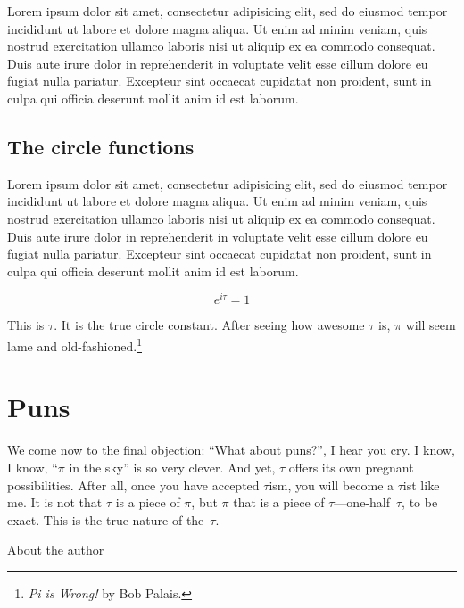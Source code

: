 \documentclass{article}
\begin{document}
Lorem ipsum dolor sit amet, consectetur adipisicing elit, sed do eiusmod tempor incididunt ut labore et dolore magna aliqua. Ut enim ad minim veniam, quis nostrud exercitation ullamco laboris nisi ut aliquip ex ea commodo consequat. Duis aute irure dolor in reprehenderit in voluptate velit esse cillum dolore eu fugiat nulla pariatur. Excepteur sint occaecat cupidatat non proident, sunt in culpa qui officia deserunt mollit anim id est laborum.

  \subsection{The circle functions} %
  \label{sec:the_circle_functions}
  
Lorem ipsum dolor sit amet, consectetur adipisicing elit, sed do eiusmod tempor incididunt ut labore et dolore magna aliqua. Ut enim ad minim veniam, quis nostrud exercitation ullamco laboris nisi ut aliquip ex ea commodo consequat. Duis aute irure dolor in reprehenderit in voluptate velit esse cillum dolore eu fugiat nulla pariatur. Excepteur sint occaecat cupidatat non proident, sunt in culpa qui officia deserunt mollit anim id est laborum.
  


\[ e^{i\tau} = 1 \]


This is $\tau$. It is the true circle constant. After seeing how awesome $\tau$ is, $\pi$ will seem lame and old-fashioned.\footnote{\emph{Pi is Wrong!} by Bob Palais.}

\section{Puns}

We come now to the final objection: ``What about puns?'', I hear you cry. I know, I know, ``$\pi$ in the sky'' is so very clever. And yet, $\tau$ offers its own pregnant possibilities. After all, once you have accepted $\tau$ism, you will become a $\tau$ist like me. It is not that $\tau$ is a piece of $\pi$, but $\pi$ that is a piece of $\tau$---one-half~$\tau$, to be exact. This is the true nature of the~$\tau$.

About the author
\end{document}
